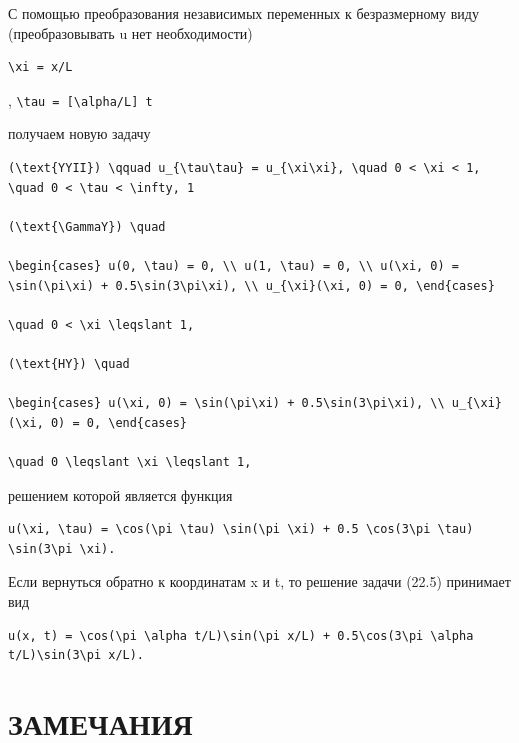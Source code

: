 \documentclass[
  ukrainian,
]{article}
\begin{document}
С помощью преобразования независимых переменных к безразмерному виду
(преобразовывать u нет необходимости)

\begin{verbatim}
\xi = x/L
\end{verbatim}

, \texttt{\textbackslash{}tau\ =\ {[}\textbackslash{}alpha/L{]}\ t}

получаем новую задачу

\begin{verbatim}
(\text{YYII}) \qquad u_{\tau\tau} = u_{\xi\xi}, \quad 0 < \xi < 1, \quad 0 < \tau < \infty, 1

(\text{\GammaY}) \quad

\begin{cases} u(0, \tau) = 0, \\ u(1, \tau) = 0, \\ u(\xi, 0) = \sin(\pi\xi) + 0.5\sin(3\pi\xi), \\ u_{\xi}(\xi, 0) = 0, \end{cases}

\quad 0 < \xi \leqslant 1,

(\text{HY}) \quad

\begin{cases} u(\xi, 0) = \sin(\pi\xi) + 0.5\sin(3\pi\xi), \\ u_{\xi}(\xi, 0) = 0, \end{cases}

\quad 0 \leqslant \xi \leqslant 1,
\end{verbatim}

решением которой является функция

\begin{verbatim}
u(\xi, \tau) = \cos(\pi \tau) \sin(\pi \xi) + 0.5 \cos(3\pi \tau) \sin(3\pi \xi).
\end{verbatim}

Если вернуться обратно к координатам x и t, то решение задачи (22.5)
принимает вид

\begin{verbatim}
u(x, t) = \cos(\pi \alpha t/L)\sin(\pi x/L) + 0.5\cos(3\pi \alpha t/L)\sin(3\pi x/L).
\end{verbatim}

\section{ЗАМЕЧАНИЯ}\label{ux437ux430ux43cux435ux447ux430ux43dux438ux44f-2}
\end{document}
